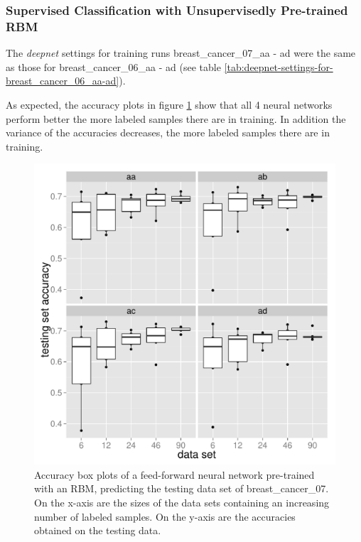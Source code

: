\subsubsection{Supervised Classification with Unsupervisedly Pre-trained RBM}

The \emph{deepnet }settings for training runs breast\_cancer\_07\_aa
- ad were the same as those for breast\_cancer\_06\_aa - ad (see table
\vref{tab:deepnet-settings-for-breast_cancer_06_aa-ad}).

As expected, the accuracy plots in figure \ref{fig:Accuracy-box-plots-of-breast_cancer_07_aa-ad}
show that all 4 neural networks perform better the more labeled samples
there are in training. In addition the variance of the accuracies
decreases, the more labeled samples there are in training.

\begin{figure}
\begin{centering}
\includegraphics[width=0.68\paperwidth]{images/breast_cancer_07-accuracies-aa_ad.pdf}
\par\end{centering}
\caption[Accuracy box plots of a feed-forward neural network pre-trained with
an RBM, predicting the testing data set of breast\_cancer\_07.]{\label{fig:Accuracy-box-plots-of-breast_cancer_07_aa-ad}Accuracy
box plots of a feed-forward neural network pre-trained with an RBM,
predicting the testing data set of breast\_cancer\_07. On the x-axis
are the sizes of the data sets containing an increasing number of
labeled samples. On the y-axis are the accuracies obtained on the
testing data.}
\end{figure}

